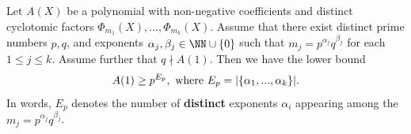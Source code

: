 \begin{theorem}\label{main theorem}
Let $A(X)$ be a polynomial with non-negative coefficients and distinct cyclotomic factors $\Phi_{m_1}(X), ..., \Phi_{m_k}(X)$.  
Assume that there exist distinct prime numbers $p,q$, and exponents $\alpha_j, \beta_j \in \NN\cup\{0\}$ such that $m_j = p^{\alpha_j} q^{\beta_j}$ for each $1 \leq j \leq k$.  Assume further that $q \nmid A(1)$.  Then we have the lower bound
$$
A(1) \geq p^{E_p}, \hbox{ where } E_p = |\{\alpha_1, ..., \alpha_k\}|.
$$
In words, $E_p$ denotes the number of \textbf{distinct} exponents $\alpha_i$ appearing among the $m_j = p^{\alpha_j} q^{\beta_j}$.
\end{theorem}
